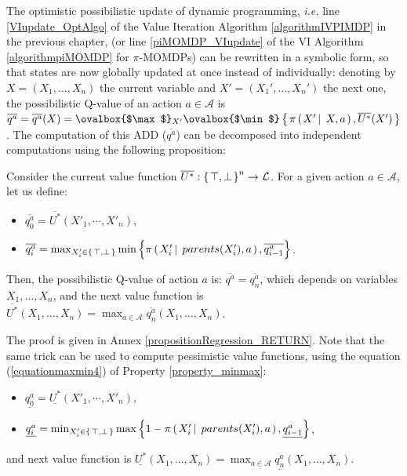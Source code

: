 The optimistic possibilistic update of dynamic programming, 
\emph{i.e.} line \ref{VIupdate_OptAlgo} 
of the Value Iteration Algorithm \ref{algorithmIVPIMDP} 
in the previous chapter,
(or line \ref{piMOMDP_VIupdate} of the VI Algorithm \ref{algorithmpiMOMDP} for $\pi$-MOMDPs)
can be rewritten in a symbolic form, so that states are
now globally updated at once instead of individually: 
denoting by $X=(X_1,\ldots,X_n)$ the current variable
and $X'=(X_1',\ldots,X_n')$ the next one,
the possibilistic Q-value of an action $a \in \mathcal{A}$
is $\overline{q^a} = \overline{q^a}(X)= \ovalbox{$\max$}_{X'} \ovalbox{$\min$} \set{ \pi \paren{ X' \sachant X,a }, \overline{U^*}(X') }$.
The computation of this ADD ($\overline{q^a}$) can be decomposed into independent computations 
using the following proposition:
\begin{Property}
\label{propositionRegression}
Consider the current value function
 $\overline{U^*}: \left\{ \left. \top,\bot \right. \right\}^n \rightarrow \mathcal{L}$. 
For a given action $a \in \mathcal{A}$, let us define:
\begin{itemize}
\item $\overline{q^a_0} = \overline{U^*}(X'_1,\cdots,X'_n)$, 
\item $\overline{q^a_i} = \max_{X'_i \in \left\{ \left. \top,\bot \right. \right\}} \min \Big\{ \pi \left( \left. X_i' \, \right| \left. \, parents(X_i'),a \right. \right) , \overline{q^a_{i-1}} \Big\}$.
\end{itemize}
Then, the possibilistic Q-value of action $a$ is: $\overline{q^a} = \overline{q^a_n}$,
which depends on variables $X_1,\ldots,X_n$,
and the next value function is $\overline{U^*}(X_1,\ldots,X_n) = \max_{a \in \mathcal{A}} \overline{q^a_n}(X_1,\ldots,X_n)$.
\end{Property}
The proof is given in Annex \ref{propositionRegression_RETURN}.
Note that the same trick can be used to compute 
pessimistic value functions,
using the equation (\ref{equationmaxmin4}) of Property \ref{property_minmax}: 
\begin{itemize}
\item $\underline{q^a_0} = \underline{U^*}(X'_1,\cdots,X'_n)$, 
\item $\underline{q^a_i} = \min_{X'_i \in \left\{ \left. \top,\bot \right. \right\}} \max \Big\{ 1 - \pi \left( \left. X_i' \, \right| \left. \, parents(X_i'),a \right. \right) , \underline{q^a_{i-1}} \Big\}$,
\end{itemize}
and next value function is $\underline{U^*}(X_1,\ldots,X_n) = \max_{a \in \mathcal{A}} \underline{q^a_n}(X_1,\ldots,X_n)$.

